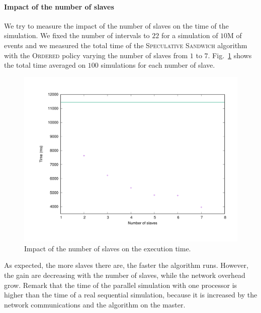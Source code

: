 \documentclass[a4paper,10pt]{article}
\begin{document}
    \paragraph{Impact of the number of slaves}
    
 We try to measure the impact of the number of slaves on the time of the simulation.
 We fixed the number of intervals to $22$ for a simulation of $10$M of events and we measured the total time of the  \textsc{Speculative Sandwich} algorithm with the \textsc{Ordered} policy varying the number of slaves from $1$ to $7$. Fig.~\ref{fig:nbservs} shows the total time averaged on $100$ simulations for each number of slave.
 
\begin{figure}[H]
\centering
\label{fig:nbservs}
 \includegraphics[scale=0.45]{numberofservers.pdf}
 \caption{Impact of the number of slaves on the execution time.}
\end{figure}
As expected, the more slaves there are, the faster the algorithm runs. However, the gain are decreasing with the number of slaves, 
while the network overhead grow. Remark that the time of the parallel simulation with one processor is higher than the time of a real sequential simulation, because it is increased by the network communications and the algorithm on the master.
%
\end{document}
